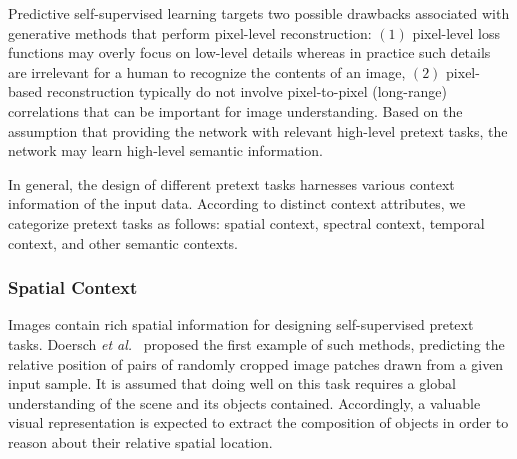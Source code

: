 \documentclass[lettersize,journal]{IEEEtran}
\newcommand{\etal}{\textit{et al.}}
\begin{document}
Predictive self-supervised learning targets two possible drawbacks associated with generative methods that perform pixel-level reconstruction: $(1)$ pixel-level loss functions may overly focus on low-level details whereas in practice such details are irrelevant for a human to recognize the contents of an image, $(2)$ pixel-based reconstruction typically do not involve pixel-to-pixel (long-range) correlations that can be important for image understanding. Based on the assumption that providing the network with relevant high-level pretext tasks, the network may learn high-level semantic information. 

In general, the design of different pretext tasks harnesses various context information of the input data. According to distinct context attributes, we categorize pretext tasks as follows: spatial context, spectral context, temporal context, and other semantic contexts.



\subsubsection{Spatial Context}

Images contain rich spatial information for designing self-supervised pretext tasks. Doersch \etal~\cite{doersch2015unsupervised} proposed the first example of such methods, predicting the relative position of pairs of randomly cropped image patches drawn from a given input sample. It is assumed that doing well on this task requires a global understanding of the scene and its objects contained. Accordingly, a valuable visual representation is expected to extract the composition of objects in order to reason about their relative spatial location. 
\end{document}
